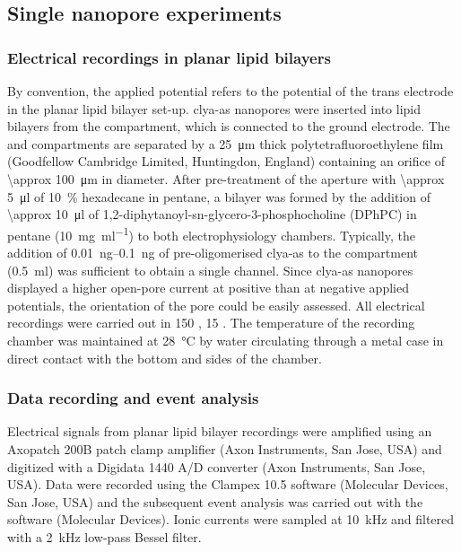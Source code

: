 \subsection{Single nanopore experiments}
%
\label{sec:trapping_appendix:nanopore_experiments}
%

\subsubsection{Electrical recordings in planar lipid bilayers}
%

By convention, the applied potential refers to the potential of the trans electrode in the planar lipid
bilayer set-up. \gls{clya-as} nanopores were inserted into lipid bilayers from the \cisi{} compartment, which
is connected to the ground electrode. The \cisi{} and \transi{} compartments are separated by a
\SI{25}{\micro\meter} thick polytetrafluoroethylene film (Goodfellow Cambridge Limited, Huntingdon, England)
containing an orifice of \SI{\approx 100}{\micro\meter} in diameter. After pre-treatment of the aperture with
\SI{\approx 5}{\micro\litre} of \SI{10}{\percent} hexadecane in pentane, a bilayer was formed by the addition
of \SI{\approx 10}{\micro\litre} of 1,2-diphytanoyl-sn-glycero-3-phosphocholine (DPhPC) in pentane
(\SI{10}{\milli\gram\per\milli\litre}) to both electrophysiology chambers. Typically, the addition of
\SIrange{0.01}{0.1}{\nano\gram} of pre-oligomerised \gls{clya-as} to the \cisi{} compartment
(\SI{0.5}{\milli\litre}) was sufficient to obtain a single channel. Since \gls{clya-as} nanopores displayed a
higher open-pore current at positive than at negative applied potentials, the orientation of the pore could be
easily assessed. All electrical recordings were carried out in \SI{150}{\mM} , \SI{15}{\mM}
 . The temperature of the recording chamber was maintained at \SI{28}{\celsius} by water
circulating through a metal case in direct contact with the bottom and sides of the chamber.


\subsubsection{Data recording and event analysis}
%

Electrical signals from planar lipid bilayer recordings were amplified using an Axopatch 200B patch clamp
amplifier (Axon Instruments, San Jose, USA) and digitized with a Digidata 1440 A/D converter (Axon
Instruments, San Jose, USA). Data were recorded using the Clampex 10.5 software (Molecular Devices, San Jose,
USA) and the subsequent event analysis was carried out with the  software (Molecular Devices).
Ionic currents were sampled at \SI{10}{\kilo\hertz} and filtered with a \SI{2}{\kilo\hertz} low-pass Bessel
filter.

